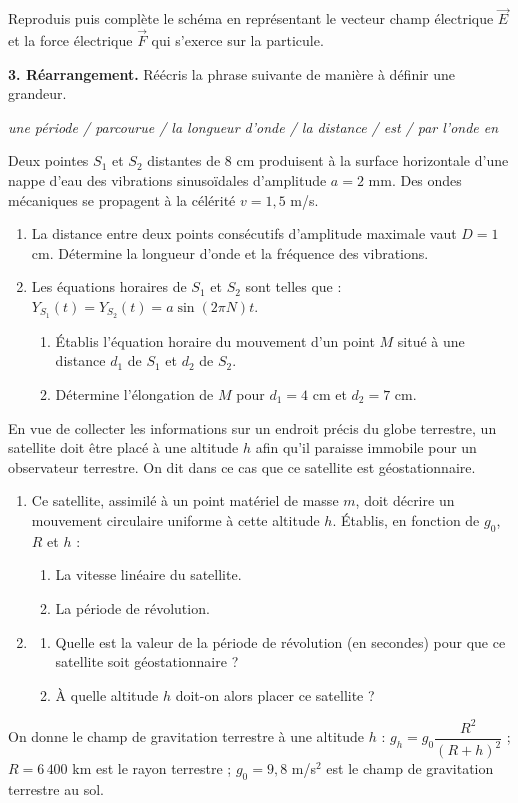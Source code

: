 \documentclass[11pt]{article}
\begin{document}
\noindent Reproduis puis complète le schéma en représentant le vecteur champ électrique $\vec{E}$ et la force électrique $\vec{F}$ qui s'exerce sur la particule.

\medskip
\noindent\textbf{3. Réarrangement.} Réécris la phrase suivante de manière à définir une grandeur.

\textit{une période / parcourue / la longueur d'onde / la distance / est / par l'onde en}

Deux pointes $S_1$ et $S_2$ distantes de 8 cm produisent à la surface horizontale d'une nappe d'eau des vibrations sinusoïdales d'amplitude $a = 2$ mm. Des ondes mécaniques se propagent à la célérité $v = 1{,}5$ m/s.

\begin{enumerate}
  \item La distance entre deux points consécutifs d'amplitude maximale vaut $D = 1$ cm. Détermine la longueur d'onde et la fréquence des vibrations.
  \item Les équations horaires de $S_1$ et $S_2$ sont telles que : $Y_{S_1}(t) = Y_{S_2}(t) = a\sin(2\pi N)t$.
  \begin{enumerate}[label=\alph*.]
    \item Établis l'équation horaire du mouvement d'un point $M$ situé à une distance $d_1$ de $S_1$ et $d_2$ de $S_2$.
    \item Détermine l'élongation de $M$ pour $d_1 = 4$ cm et $d_2 = 7$ cm.
  \end{enumerate}
\end{enumerate}

En vue de collecter les informations sur un endroit précis du globe terrestre, un satellite doit être placé à une altitude $h$ afin qu'il paraisse immobile pour un observateur terrestre. On dit dans ce cas que ce satellite est géostationnaire.

\begin{enumerate}
  \item Ce satellite, assimilé à un point matériel de masse $m$, doit décrire un mouvement circulaire uniforme à cette altitude $h$. Établis, en fonction de $g_0$, $R$ et $h$ :
  \begin{enumerate}[label=\alph*.]
    \item La vitesse linéaire du satellite.
    \item La période de révolution.
  \end{enumerate}
  \item \begin{enumerate}[label=\alph*.]
    \item Quelle est la valeur de la période de révolution (en secondes) pour que ce satellite soit géostationnaire ?
    \item À quelle altitude $h$ doit-on alors placer ce satellite ?
  \end{enumerate}
\end{enumerate}
\noindent On donne le champ de gravitation terrestre à une altitude $h$ : $g_h = g_0\dfrac{R^2}{(R + h)^2}$ ; $R = 6\,400$ km est le rayon terrestre ; $g_0 = 9{,}8$ m/s$^2$ est le champ de gravitation terrestre au sol.
\end{document}

